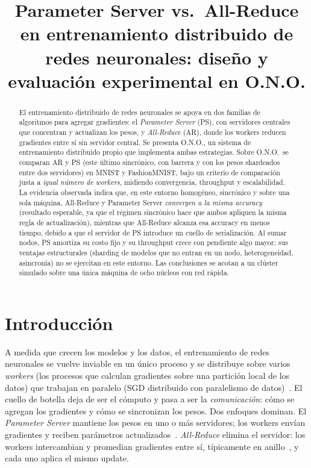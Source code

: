 \documentclass[conference,10pt]{IEEEtran}
\begin{document}
\title{Parameter Server vs.\ All-Reduce en entrenamiento distribuido de redes
neuronales: dise\~no y evaluaci\'on experimental en O.N.O.}

\author{
}

\maketitle

\begin{abstract}
El entrenamiento distribuido de redes neuronales se apoya en dos familias de
algoritmos para agregar gradientes: el \emph{Parameter Server} (PS), con servidores
centrales que concentran y actualizan los pesos, y \emph{All-Reduce} (AR), donde los
workers reducen gradientes entre s\'i sin servidor central. Se presenta O.N.O., un
sistema de entrenamiento distribuido propio que implementa ambas estrategias. Sobre
O.N.O.\ se comparan AR y PS (este \'ultimo sincr\'onico, con barrera y con los pesos
shardeados entre dos servidores) en MNIST y FashionMNIST, bajo un criterio de
comparaci\'on justa a \emph{igual n\'umero de workers}, midiendo convergencia,
throughput y escalabilidad. La evidencia observada indica que, en este entorno
homog\'eneo, sincr\'onico y sobre una sola m\'aquina, All-Reduce y Parameter Server
\emph{convergen a la misma accuracy} (resultado esperable, ya que el r\'egimen
sincr\'onico hace que ambos apliquen la misma regla de actualizaci\'on), mientras que
All-Reduce alcanza esa accuracy en menos tiempo, debido a que el servidor de PS
introduce un cuello de serializaci\'on. Al sumar nodos, PS amortiza su costo fijo y su
throughput crece con pendiente algo mayor; sus ventajas estructurales (sharding de
modelos que no entran en un nodo, heterogeneidad, asincron\'ia) no se ejercitan en este
entorno. Las conclusiones se acotan a un cl\'uster simulado sobre una \'unica m\'aquina
de ocho n\'ucleos con red r\'apida.
\end{abstract}

\section{Introducci\'on}
A medida que crecen los modelos y los datos, el entrenamiento de redes neuronales se
vuelve inviable en un \'unico proceso y se distribuye sobre varios \emph{workers}
(los procesos que calculan gradientes sobre una partici\'on local de los datos) que
trabajan en paralelo (SGD distribuido con paralelismo de
datos)~\cite{bennun2019demystifying}. El cuello de botella deja de ser el c\'omputo y
pasa a ser la \emph{comunicaci\'on}: c\'omo se agregan los gradientes y c\'omo se
sincronizan los pesos. Dos enfoques dominan. El \emph{Parameter Server} mantiene los
pesos en uno o m\'as servidores; los workers env\'ian gradientes y reciben par\'ametros
actualizados~\cite{li2014scaling}. \emph{All-Reduce} elimina el servidor: los workers
intercambian y promedian gradientes entre s\'i, t\'ipicamente en
anillo~\cite{gibiansky2017bringing,sergeev2018horovod}, y cada uno aplica el mismo
update.
\end{document}
